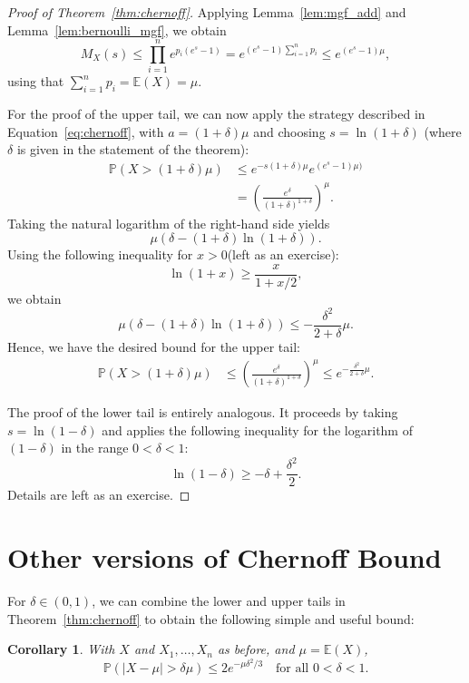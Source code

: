\documentclass[10pt]{article}
\newtheorem{corollary}[theorem]{Corollary}
\newcommand{\E}{\mathbb{E}}
\renewcommand{\Pr}{\mathbb{P}}
\begin{document}
\begin{proof}[Proof of Theorem~\ref{thm:chernoff}]
Applying Lemma~\ref{lem:mgf_add} and Lemma~\ref{lem:bernoulli_mgf}, we obtain
\begin{equation}\label{eq:main}
 M_X(s) \leq \prod_{i=1}^n e^{p_i(e^s-1)} = e^{(e^s-1)\sum_{i=1}^n p_i} \leq e^{(e^s-1)\mu}, 
\end{equation}
    using that $\sum_{i=1}^n p_i = \E(X) = \mu$.

    For the proof of the upper tail, we can now apply the strategy described in
    Equation~\ref{eq:chernoff}, with $a= (1+\delta) \mu$ and choosing $s=\ln(1+\delta)$ (where $\delta$ is given in the statement of the theorem):
    \begin{align*}
        \Pr(X > (1+\delta)\mu) &\leq e^{-s(1+\delta)\mu}e^{(e^s-1)\mu)}\\
        &= \left(\frac{e^{\delta}}{(1+\delta)^{1+\delta}}\right)^\mu.
    \end{align*}
Taking the natural logarithm of the right-hand side yields
$$
\mu (\delta - (1+\delta)\ln(1+\delta)).
$$
Using the following inequality for $x > 0$(left as an exercise):
$$
\ln (1+ x) \geq \frac{x}{1+x/2},
$$
we obtain
$$
\mu (\delta - (1+\delta)\ln(1+\delta)) \leq - \frac{\delta^2}{2+\delta} \mu.
$$
Hence, we have the desired bound for the upper tail:
\begin{align*}
        \Pr(X > (1+\delta)\mu) &\leq  \left(\frac{e^{\delta}}{(1+\delta)^{1+\delta}}\right)^\mu \leq e^{- \frac{\delta^2}{2+\delta} \mu}.
    \end{align*}

    The proof of the lower tail is entirely analogous. It proceeds by taking $s = \ln(1-\delta)$ and applies the following inequality for the logarithm of $(1 - \delta)$ in the range $0 < \delta < 1:$
$$
\ln(1-\delta) \geq -\delta + \frac{\delta^2}{2}.
$$  
Details are left as an exercise.
\end{proof}

\section{Other versions of Chernoff Bound}

For $\delta \in (0,1)$, we can combine the lower and upper tails in Theorem~\ref{thm:chernoff} to obtain the following simple and useful bound:
\begin{corollary}\label{cor:twosides}
    With $X$ and $X_1, \ldots, X_n$ as before, and $\mu = \E(X)$, 
    \[ \Pr(|X - \mu| > \delta\mu) \leq 2e^{-\mu \delta^2/3} \quad \text{for all } 0 < \delta < 1. \]
\end{corollary}
\end{document}

